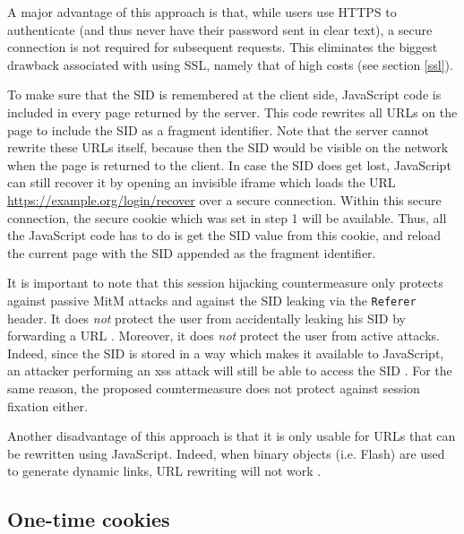 A major advantage of this approach is that, while users use HTTPS to authenticate (and thus never have their password sent in clear text), a secure connection is not required for subsequent requests. This eliminates the biggest drawback associated with using SSL, namely that of high costs (see section \ref{ssl}).

To make sure that the SID is remembered at the client side, JavaScript code is included in every page returned by the server. This code rewrites all URLs on the page to include the SID as a fragment identifier. Note that the server cannot rewrite these URLs itself, because then the SID would be visible on the network when the page is returned to the client. In case the SID does get lost, JavaScript can still recover it by opening an invisible iframe which loads the URL \url{https://example.org/login/recover} over a secure connection. Within this secure connection, the secure cookie which was set in step 1 will be available. Thus, all the JavaScript code has to do is get the SID value from this cookie, and reload the current page with the SID appended as the fragment identifier.

It is important to note that this session hijacking countermeasure only protects against passive MitM attacks and against the SID leaking via the \texttt{Referer} header. It does \emph{not} protect the user from accidentally leaking his SID by forwarding a URL \cite{Adida2008}. Moreover, it does \emph{not} protect the user from active attacks. Indeed, since the SID is stored in a way which makes it available to JavaScript, an attacker performing an \gls{xss} attack will still be able to access the SID \cite{Dacosta2011}. For the same reason, the proposed countermeasure does not protect against session fixation either.

Another disadvantage of this approach is that it is only usable for URLs that can be rewritten using JavaScript. Indeed, when binary objects (i.e. Flash) are used to generate dynamic links, URL rewriting will not work \cite{Dacosta2011}.

\subsection{One-time cookies}

